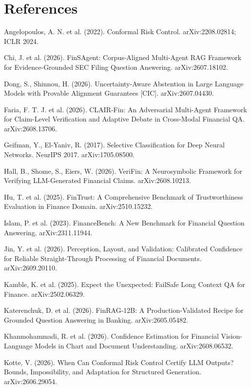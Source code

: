 \documentclass[11pt]{article}
\begin{document}
\section*{References}\begin{list}{}{\setlength{\leftmargin}{1.5em}\setlength{\itemindent}{-1.5em}\setlength{\itemsep}{2pt}}
\small
\item Angelopoulos, A. N. et al. (2022). Conformal Risk Control. arXiv:2208.02814; ICLR 2024.
\item Chi, J. et al. (2026). FinSAgent: Corpus-Aligned Multi-Agent RAG Framework for Evidence-Grounded SEC Filing Question Answering. arXiv:2607.18102.
\item Dong, S., Shinnou, H. (2026). Uncertainty-Aware Abstention in Large Language Models with Provable Alignment Guarantees [CIC]. arXiv:2607.04430.
\item Faria, F. T. J. et al. (2026). CLAIR-Fin: An Adversarial Multi-Agent Framework for Claim-Level Verification and Adaptive Debate in Cross-Modal Financial QA. arXiv:2608.13706.
\item Geifman, Y., El-Yaniv, R. (2017). Selective Classification for Deep Neural Networks. NeurIPS 2017. arXiv:1705.08500.
\item Hall, B., Shome, S., Eiers, W. (2026). VeriFin: A Neurosymbolic Framework for Verifying LLM-Generated Financial Claims. arXiv:2608.10213.
\item Hu, T. et al. (2025). FinTrust: A Comprehensive Benchmark of Trustworthiness Evaluation in Finance Domain. arXiv:2510.15232.
\item Islam, P. et al. (2023). FinanceBench: A New Benchmark for Financial Question Answering. arXiv:2311.11944.
\item Jin, Y. et al. (2026). Perception, Layout, and Validation: Calibrated Confidence for Reliable Straight-Through Processing of Financial Documents. arXiv:2609.20110.
\item Kamble, K. et al. (2025). Expect the Unexpected: FailSafe Long Context QA for Finance. arXiv:2502.06329.
\item Katerenchuk, D. et al. (2026). FinRAG-12B: A Production-Validated Recipe for Grounded Question Answering in Banking. arXiv:2605.05482.
\item Khanmohammadi, R. et al. (2026). Confidence Estimation for Financial Vision-Language Models in Chart and Document Understanding. arXiv:2608.06532.
\item Kotte, V. (2026). When Can Conformal Risk Control Certify LLM Outputs? Bounds, Impossibility, and Adaptation for Structured Generation. arXiv:2606.29054.

\end{list}
\end{document}
